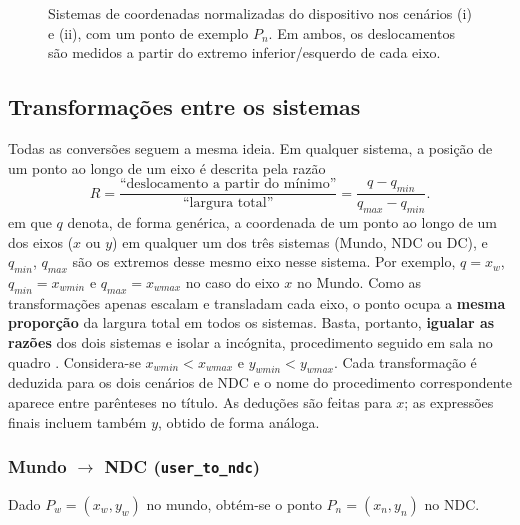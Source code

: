 \begin{figure}[H]
    \centering
    \caption{Sistemas de coordenadas normalizadas do dispositivo nos cenários (i) e (ii), com um ponto de exemplo $P_n$. Em ambos, os deslocamentos são medidos a partir do extremo inferior/esquerdo de cada eixo.}
    \label{fig:ndc}
\end{figure}

\subsection{Transformações entre os sistemas}
Todas as conversões seguem a mesma ideia. Em qualquer sistema, a posição de um ponto ao longo de um eixo é descrita pela razão
\[
    R = \frac{\text{``deslocamento a partir do mínimo''}}{\text{``largura total''}} = \frac{q - q_{min}}{q_{max} - q_{min}}.
\]
em que $q$ denota, de forma genérica, a coordenada de um ponto ao longo de um dos eixos ($x$ ou $y$) em qualquer um dos três sistemas (Mundo, NDC ou DC), e $q_{min}$, $q_{max}$ são os extremos desse mesmo eixo nesse sistema. Por exemplo, $q = x_w$, $q_{min} = x_{wmin}$ e $q_{max} = x_{wmax}$ no caso do eixo $x$ no Mundo. Como as transformações apenas escalam e transladam cada eixo, o ponto ocupa a \textbf{mesma proporção} da largura total em todos os sistemas. Basta, portanto, \textbf{igualar as razões} dos dois sistemas e isolar a incógnita, procedimento seguido em sala no quadro \cite{quadro2}. Considera-se $x_{wmin} < x_{wmax}$ e $y_{wmin} < y_{wmax}$. Cada transformação é deduzida para os dois cenários de NDC e o nome do procedimento correspondente aparece entre parênteses no título. As deduções são feitas para $x$; as expressões finais incluem também $y$, obtido de forma análoga.

\subsubsection{\texorpdfstring{Mundo $\rightarrow$ NDC}{Mundo -> NDC} (\texttt{user\_to\_ndc})}
Dado $P_w = (x_w, y_w)$ no mundo, obtém-se o ponto $P_n = (x_n, y_n)$ no NDC.

